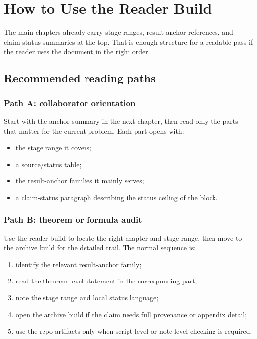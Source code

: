 \chapter{How to Use the Reader Build}
\label{chap:reader-guide}

The main chapters already carry stage ranges, result-anchor references, and
claim-status summaries at the top. That is enough structure for a readable pass
if the reader uses the document in the right order.

\section{Recommended reading paths}

\subsection*{Path A: collaborator orientation}

Start with the anchor summary in the next chapter, then read only the parts
that matter for the current problem. Each part opens with:
\begin{itemize}[leftmargin=2.2em]
  \item the stage range it covers;
  \item a source/status table;
  \item the result-anchor families it mainly serves;
  \item a claim-status paragraph describing the status ceiling of the block.
\end{itemize}

\subsection*{Path B: theorem or formula audit}

Use the reader build to locate the right chapter and stage range, then move to
the archive build for the detailed trail. The normal sequence is:
\begin{enumerate}[leftmargin=2.2em]
  \item identify the relevant result-anchor family;
  \item read the theorem-level statement in the corresponding part;
  \item note the stage range and local status language;
  \item open the archive build if the claim needs full provenance or appendix
  detail;
  \item use the repo artifacts only when script-level or note-level checking is
  required.
\end{enumerate}

